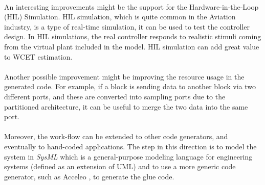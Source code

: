 \paragraph{} An interesting improvements might be the support for the Hardware-in-the-Loop (HIL) Simulation. HIL simulation, which is quite common in the Aviation industry, is a type of real-time simulation, it can be used to test the controller design. In HIL simulations, the real controller responds to realistic stimuli coming from the virtual plant included in the model. HIL simulation can add great value to WCET estimation.

\paragraph{} Another possible improvement might be improving the resource usage in the generated code. For example, if a block is sending data to another block via two different ports, and these are converted into sampling ports due to the partitioned architecture, it can be useful to merge the two data into the same port.

\paragraph{} Moreover, the work-flow can be extended to other code generators, and eventually to hand-coded applications. The step in this direction is to model the system in \emph{SysML} \cite{sysml} which is a general-purpose modeling language for engineering systems (defined as an extension of UML) and to use a more generic code generator, such as Acceleo \cite{Acceleo}, to generate the glue code.
